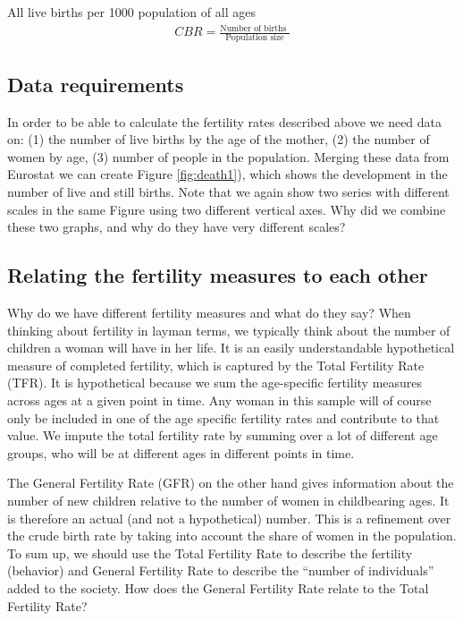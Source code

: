 \documentclass[]{book}
\begin{document}
All live births per 1000 population of all ages
\begin{align}
    CBR=\frac{\text{Number of births }}{\text{Population size} }
  \end{align}

\hypertarget{data-requirements}{%
\subsection{Data requirements}\label{data-requirements}}

In order to be able to calculate the fertility rates described above we need data on: (1) the number of live births by the age of the mother, (2) the number of women by age, (3) number of people in the population. Merging these data from Eurostat we can create Figure \ref{fig:death1}), which shows the development in the number of live and still births. Note that we again show two series with different scales in the same Figure using two different vertical axes. Why did we combine these two graphs, and why do they have very different scales?

\hypertarget{relating-the-fertility-measures-to-each-other}{%
\subsection{Relating the fertility measures to each other}\label{relating-the-fertility-measures-to-each-other}}

Why do we have different fertility measures and what do they say? When thinking about fertility in layman terms, we typically think about the number of children a woman will have in her life. It is an easily understandable hypothetical measure of completed fertility, which is captured by the Total Fertility Rate (TFR). It is hypothetical because we sum the age-specific fertility measures across ages at a given point in time. Any woman in this sample will of course only be included in one of the age specific fertility rates and contribute to that value. We impute the total fertility rate by summing over a lot of different age groups, who will be at different ages in different points in time.

The General Fertility Rate (GFR) on the other hand gives information about the number of new children relative to the number of women in childbearing ages. It is therefore an actual (and not a hypothetical) number. This is a refinement over the crude birth rate by taking into account the share of women in the population. To sum up, we should use the Total Fertility Rate to describe the fertility (behavior) and General Fertility Rate to describe the ``number of individuals'' added to the society. How does the General Fertility Rate relate to the Total Fertility Rate?
\end{document}
